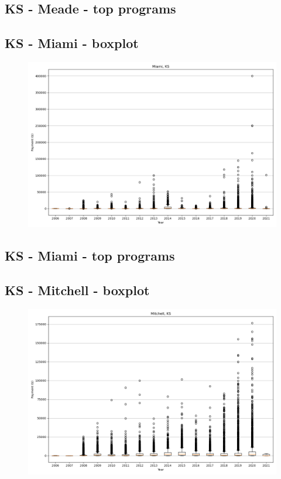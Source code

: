 \subsection*{KS - Meade - top programs}

\newpage
\subsection*{KS - Miami - boxplot}
\begin{figure}[h]
\centering
\includegraphics[width=7in]{../output/boxplots/counties/Miami-KS_boxplot.png}
\end{figure}


\subsection*{KS - Miami - top programs}

\newpage
\subsection*{KS - Mitchell - boxplot}
\begin{figure}[h]
\centering
\includegraphics[width=7in]{../output/boxplots/counties/Mitchell-KS_boxplot.png}
\end{figure}


